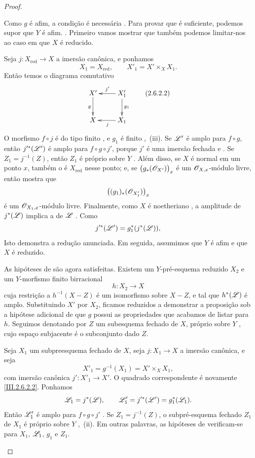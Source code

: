 \begin{proof}
\begin{env}[2.6.2.1]
\label{III.2.6.2.1}
Como $g$ é afim, a condição é necessária .
Para provar que é suficiente, podemos supor que $Y$ é afim.
.
Primeiro vamos mostrar que também podemos limitar-nos ao caso em que $X$ é
reducido.

Seja $j:X_{\mathrm{red}}\to X$ a imersão canônica, e ponhamos
\[
  X_1=X_{\mathrm{red}},
  \qquad
  X'_1=X'\times_X X_1.
\]
Então temos o diagrama comutativo
\[
  \xymatrix{
    X'\ar[d]_g &
    X'_1\ar[l]_{j'}\ar[d]^{g_1}\\
    X &
    X_1\ar[l]^{j}
  }
  \label{III.2.6.2.2}\tag{2.6.2.2}
\]
O morfismo $f\circ j$ é do tipo finito , e
$g_1$ é finito ,~(iii).
Se $\mathscr{L}'$ é amplo para $f\circ g$, então
$j'^*(\mathscr{L}')$ é amplo para $f\circ g\circ j'$, porque $j'$ é uma
imersão fechada  e .
Se $Z_1=j^{-1}(Z)$, então $Z_1$ é próprio sobre $Y$
.
Além disso, se $X$ é normal em um ponto $x$, também o é $X_{\mathrm{red}}$
nesse ponto; e, se
$\bigl(g_*(\mathscr{O}_{X'})\bigr)_x$ é um $\mathscr{O}_{X,x}$-módulo livre,
então  mostra que
\[
  \bigl((g_1)_*(\mathscr{O}_{X'_1})\bigr)_x
\]
é um $\mathscr{O}_{X_1,x}$-módulo livre.
Finalmente, como $X$ é noetheriano , a amplitude de
$j^*(\mathscr{L})$ implica a de $\mathscr{L}$ .
Como
\[
  j'^*(\mathscr{L}')=g_1^*(j^*(\mathscr{L})),
\]
Isto demonstra a redução anunciada.
Em seguida, assumimos que $Y$ é afim e que $X$ é reduzido.
\end{env}

As hipóteses de  são agora satisfeitas.
Existem um $Y$-pré-esquema reduzido $X_2$ e um
$Y$-morfismo finito birracional
\[
  h:X_2\to X
\]
cuja restrição a $h^{-1}(X-Z)$ é um isomorfismo sobre $X-Z$, e
tal que $h^*(\mathscr{L})$ é amplo.
Substituindo $X'$ por $X_2$, ficamos reduzidos a demonstrar a proposição sob
a hipótese adicional de que $g$ possui as propriedades que acabamos de listar para
$h$.
Seguimos denotando por $Z$ um subesquema fechado de $X$, próprio sobre
$Y$ , cujo espaço subjacente é o subconjunto dado
$Z$.

\begin{env}[2.6.2.3]
\label{III.2.6.2.3}
Seja $X_1$ um subpreesquema fechado de $X$, seja $j:X_1\to X$ a
imersão canônica, e seja
\[
  X'_1=g^{-1}(X_1)=X'\times_X X_1,
\]
com imersão canônica $j':X'_1\to X'$.
O quadrado correspondente é novamente \eqref{III.2.6.2.2}.
Ponhamos
\[
  \mathscr{L}_1=j^*(\mathscr{L}),
  \qquad
  \mathscr{L}'_1=j'^*(\mathscr{L}')=g_1^*(\mathscr{L}_1).
\]
Então $\mathscr{L}'_1$ é amplo para $f\circ g\circ j'$
.
Se $Z_1=j^{-1}(Z)$, o subpré-esquema fechado $Z_1$ de $X_1$ é próprio
sobre $Y$ ,~(ii).
Em outras palavras, as hipóteses de  verificam-se para
$X_1$, $\mathscr{L}_1$, $g_1$ e $Z_1$.
\end{env}


\end{proof}
